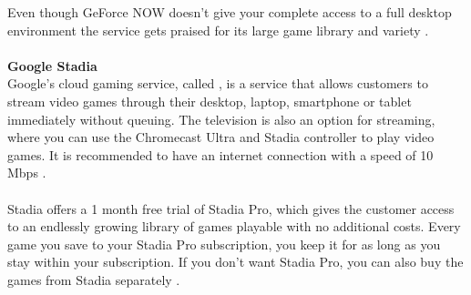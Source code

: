 Even though GeForce NOW doesn't give your complete access to a full desktop environment the service gets praised for its large game library and variety \parencite{now}.\\\\
\textbf{Google Stadia}\\
Google's cloud gaming service, called , is a service that allows customers to stream video games through their desktop, laptop, smartphone or tablet immediately without queuing. The television is also an option for streaming, where you can use the Chromecast Ultra and Stadia controller to play video games. It is recommended to have an internet connection with a speed of 10 Mbps \parencite{stadia}.\\\\
Stadia offers a 1 month free trial of Stadia Pro, which gives the customer access to an endlessly growing library of games playable with no additional costs. Every game you save to your Stadia Pro subscription, you keep it for as long as you stay within your subscription. If you don't want Stadia Pro, you can also buy the games from Stadia separately \parencite{stadia}.\\\\